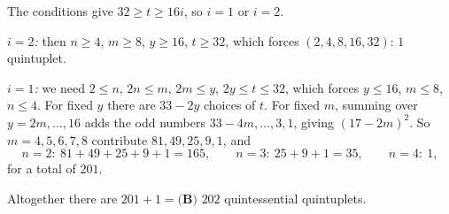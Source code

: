The conditions give $32\ge t\ge16i$, so $i=1$ or $i=2$.

\emph{$i=2$:} then $n\ge4$, $m\ge8$, $y\ge16$, $t\ge32$, which forces $(2,4,8,16,32)$: $1$ quintuplet.

\emph{$i=1$:} we need $2\le n$, $2n\le m$, $2m\le y$, $2y\le t\le32$, which forces $y\le16$, $m\le8$, $n\le4$. For fixed $y$ there are $33-2y$ choices of $t$. For fixed $m$, summing over $y=2m,\dots,16$ adds the odd numbers $33-4m,\dots,3,1$, giving $(17-2m)^2$. So $m=4,5,6,7,8$ contribute $81,49,25,9,1$, and
\[n=2:\ 81+49+25+9+1=165,\qquad n=3:\ 25+9+1=35,\qquad n=4:\ 1,\]
for a total of $201$.

Altogether there are $201+1=\boxed{\textbf{(B) } 202}$ quintessential quintuplets.
